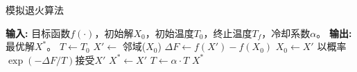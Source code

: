 \documentclass{article}
\begin{document}
	
	\begin{algorithm}
		\caption{模拟退火算法}
		\begin{algorithmic}[1]
			\State \textbf{输入:} 目标函数$f(\cdot)$，初始解$X_0$，初始温度$T_0$，终止温度$T_f$，冷却系数$\alpha$。
			\State \textbf{输出:} 最优解$X^*$。
			\State $T \gets T_0$ 
			\State $X' \gets$ 邻域($X_0$) 
			\State $\Delta F \gets f(X') - f(X_0)$ 
			\State $X_0 \gets X'$ 
			\Else
			\State 以概率$\exp(-\Delta F / T)$接受$X'$ 
			\EndIf
			\State $X^* \gets X'$ 
			\EndIf
			\EndFor
			\State $T \gets \alpha \cdot T$ 
			\EndWhile
			\State \Return $X^*$
		\end{algorithmic}
	\end{algorithm}
	
\end{document}
